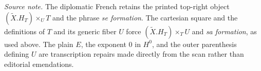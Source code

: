 \medskip
\noindent\emph{Source note.}
The diplomatic French retains the printed top-right object
$(\widetilde X.H_T)\times_U T$ and the phrase \emph{se formation}.
The cartesian square and the definitions of $T$ and its generic fiber $U$
force $(\widetilde X.H_T)\times_T U$ and \emph{sa formation}, as used above.
The plain $E$, the exponent $0$ in $H^0$, and the outer parenthesis defining
$U$ are transcription repairs made directly from the scan rather than
editorial emendations.
